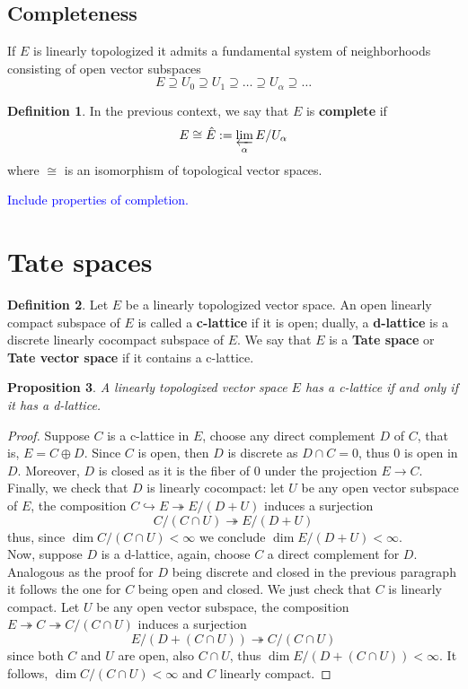 \documentclass{book}[12pt]
\theoremstyle{definition}
\newtheorem{definition}{Definition}[chapter]
\theoremstyle{plain}
\newtheorem{proposition}[definition]{Proposition}
\theoremstyle{remark}
\begin{document}
 	\subsection*{Completeness}
 	If $E$ is linearly topologized it admits a fundamental system of neighborhoods consisting of open vector subspaces 
 	\[
 		E \supseteq U_{0} \supseteq U_{1} \supseteq \ldots \supseteq U_{\alpha} \supseteq \ldots
 	\]
 	\begin{definition}\label{compleness-inverse-limit}
 		In the previous context, we say that $E$ is \textbf{complete} if 
 		\[
 			E \cong \hat{E} := \varprojlim_{\alpha} E/U_{\alpha}
 		\]
 		where $\cong$ is an isomorphism of topological vector spaces.
 	\end{definition}
 	\textcolor{blue}{Include properties of completion.} 
 	\section{Tate spaces}
 	\begin{definition}\label{tate-vector-space}
 		Let $E$ be a linearly topologized vector space. An open linearly compact subspace of $E$ is called a \textbf{c-lattice} if it is open; dually, a \textbf{d-lattice} is a discrete linearly cocompact subspace of $E$. We say that $E$ is a \textbf{Tate space} or \textbf{Tate vector space} if it contains a c-lattice.
 	\end{definition}
 	\begin{proposition}\label{c-lattice-iff-d-lattice}
 		A linearly topologized vector space $E$ has a c-lattice if and only if it has a d-lattice. 
 	\end{proposition}
 	\begin{proof}
 		Suppose $C$ is a c-lattice in $E$, choose any direct complement $D$ of $C$, that is, $E = C \oplus D$. Since $C$ is open, then $D$ is discrete as $D\cap C = 0$, thus ${0}$ is open in $D$. Moreover, $D$ is closed as it is the fiber of $0$ under the projection $E \to C$. Finally, we check that $D$ is linearly cocompact: let $U$ be any open vector subspace of $E$, the composition $C \hookrightarrow E \twoheadrightarrow E/(D+U)$ induces a surjection 
 		\[
 			C/(C \cap U) \twoheadrightarrow E/(D+U)
 		\]
 		thus, since $\dim C / (C \cap U) < \infty$ we conclude $\dim E/(D+U) < \infty$. \\

 		 Now, suppose $D$ is a d-lattice, again, choose $C$ a direct complement for $D$. Analogous as the proof for $D$ being discrete and closed in the previous paragraph it follows the one for $C$ being open and closed. We just check that $C$ is linearly compact. Let $U$ be any open vector subspace, the composition $E \twoheadrightarrow C \twoheadrightarrow C/(C \cap U)$ induces a surjection
 		 \[
 		 	E/(D + (C \cap U)) \twoheadrightarrow C/(C \cap U)
 		 \]
 		 since both $C$ and $U$ are open, also $C\cap U$, thus $\dim E/(D + (C \cap U)) < \infty$. It follows, $\dim C/(C \cap U) < \infty$ and $C$ linearly compact.  
 	\end{proof}
\end{document}
